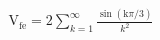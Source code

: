 \documentclass[preview]{standalone}
\begin{document}
\begin{align*}
\mathrm{V}_{\mathrm{fe}}=2\sum_{k=1}^{\infty}\frac{\sin\!\left(\mathrm{k}\pi/3\right)}{k^2}
\end{align*}
\end{document}
